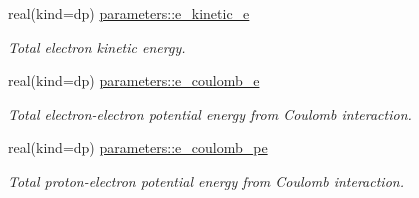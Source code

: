 \begin{DoxyCompactItemize}
real(kind=dp) \mbox{\hyperlink{group__ELECTRONS_ga3fd2374e88574f66a4a05db80b0c045b}{parameters\+::e\+\_\+kinetic\+\_\+e}}
\begin{DoxyCompactList}\small\item\em Total electron kinetic energy. \end{DoxyCompactList}\item 
real(kind=dp) \mbox{\hyperlink{group__ELECTRONS_gae8693f5e86170e1a2d3e4a4f7dc81c37}{parameters\+::e\+\_\+coulomb\+\_\+e}}
\begin{DoxyCompactList}\small\item\em Total electron-\/electron potential energy from Coulomb interaction. \end{DoxyCompactList}\item 
real(kind=dp) \mbox{\hyperlink{group__ELECTRONS_ga62c8de947854059418c7f8c8e5cd9458}{parameters\+::e\+\_\+coulomb\+\_\+pe}}
\begin{DoxyCompactList}\small\item\em Total proton-\/electron potential energy from Coulomb interaction. \end{DoxyCompactList}\end{DoxyCompactItemize}
